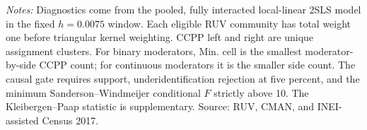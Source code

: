 \begin{table}[!htbp]
\centering
\caption{Local support and fuzzy-heterogeneity identification diagnostics}
\label{tab:hte-2017_household-diagnostics}
\small
{}
\parbox{0.97\linewidth}{\footnotesize \textit{Notes:} Diagnostics come from the pooled, fully interacted local-linear 2SLS model in the fixed \(h=0.0075\) window. Each eligible RUV community has total weight one before triangular kernel weighting. CCPP left and right are unique assignment clusters. For binary moderators, Min. cell is the smallest moderator-by-side CCPP count; for continuous moderators it is the smaller side count. The causal gate requires support, underidentification rejection at five percent, and the minimum Sanderson--Windmeijer conditional \(F\) strictly above 10. The Kleibergen--Paap statistic is supplementary. Source: RUV, CMAN, and INEI-assisted Census 2017.}
\end{table}
